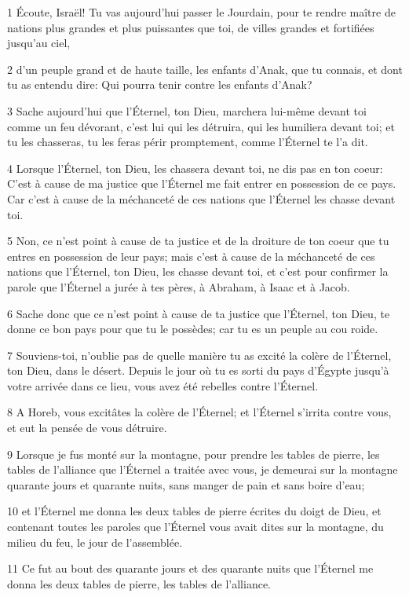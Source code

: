 \par 1 Écoute, Israël! Tu vas aujourd'hui passer le Jourdain, pour te rendre maître de nations plus grandes et plus puissantes que toi, de villes grandes et fortifiées jusqu'au ciel,
\par 2 d'un peuple grand et de haute taille, les enfants d'Anak, que tu connais, et dont tu as entendu dire: Qui pourra tenir contre les enfants d'Anak?
\par 3 Sache aujourd'hui que l'Éternel, ton Dieu, marchera lui-même devant toi comme un feu dévorant, c'est lui qui les détruira, qui les humiliera devant toi; et tu les chasseras, tu les feras périr promptement, comme l'Éternel te l'a dit.
\par 4 Lorsque l'Éternel, ton Dieu, les chassera devant toi, ne dis pas en ton coeur: C'est à cause de ma justice que l'Éternel me fait entrer en possession de ce pays. Car c'est à cause de la méchanceté de ces nations que l'Éternel les chasse devant toi.
\par 5 Non, ce n'est point à cause de ta justice et de la droiture de ton coeur que tu entres en possession de leur pays; mais c'est à cause de la méchanceté de ces nations que l'Éternel, ton Dieu, les chasse devant toi, et c'est pour confirmer la parole que l'Éternel a jurée à tes pères, à Abraham, à Isaac et à Jacob.
\par 6 Sache donc que ce n'est point à cause de ta justice que l'Éternel, ton Dieu, te donne ce bon pays pour que tu le possèdes; car tu es un peuple au cou roide.
\par 7 Souviens-toi, n'oublie pas de quelle manière tu as excité la colère de l'Éternel, ton Dieu, dans le désert. Depuis le jour où tu es sorti du pays d'Égypte jusqu'à votre arrivée dans ce lieu, vous avez été rebelles contre l'Éternel.
\par 8 A Horeb, vous excitâtes la colère de l'Éternel; et l'Éternel s'irrita contre vous, et eut la pensée de vous détruire.
\par 9 Lorsque je fus monté sur la montagne, pour prendre les tables de pierre, les tables de l'alliance que l'Éternel a traitée avec vous, je demeurai sur la montagne quarante jours et quarante nuits, sans manger de pain et sans boire d'eau;
\par 10 et l'Éternel me donna les deux tables de pierre écrites du doigt de Dieu, et contenant toutes les paroles que l'Éternel vous avait dites sur la montagne, du milieu du feu, le jour de l'assemblée.
\par 11 Ce fut au bout des quarante jours et des quarante nuits que l'Éternel me donna les deux tables de pierre, les tables de l'alliance.
